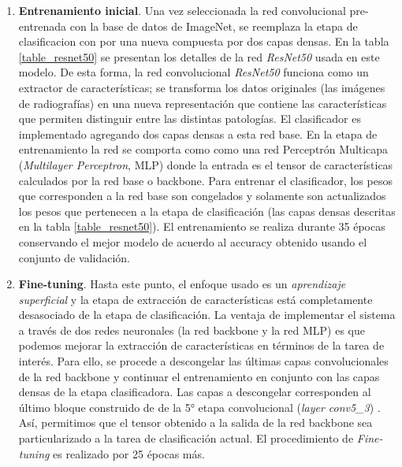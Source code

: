 {%
\begin{enumerate}
    \item \textbf{Entrenamiento inicial}. Una vez seleccionada la red convolucional pre-entrenada
          con la base de datos de ImageNet, se reemplaza la etapa de clasificacion con por una nueva
          compuesta por dos capas densas. En la tabla \ref{table_resnet50} se presentan los detalles
          de la red \textit{ResNet50} usada en este modelo. De esta forma, la red convolucional
          \textit{ResNet50} funciona como un extractor de características; se transforma los datos
          originales (las imágenes de radiografías) en una nueva representación que contiene las
          características que permiten distinguir entre las distintas patologías. El clasificador es
          implementado agregando dos capas densas a esta red base. En la etapa de entrenamiento la
          red se comporta como como una red Perceptrón Multicapa (\textit{Multilayer Perceptron},
          MLP) donde la entrada es el tensor de características calculados por la red base o
          backbone. Para entrenar el clasificador, los pesos que corresponden a la red base son
          congelados y solamente son actualizados los pesos que pertenecen a la etapa de
          clasificación (las capas densas descritas en la tabla \ref{table_resnet50}). El
          entrenamiento se realiza durante 35 épocas conservando el mejor modelo de acuerdo al
          accuracy obtenido usando el conjunto de validación.

    \item \textbf{Fine-tuning}. Hasta este punto, el enfoque usado es un \textit{aprendizaje superficial}
          y la etapa de extracción de características está completamente desasociado de la etapa de
          clasificación. La ventaja de implementar el sistema a través de dos redes neuronales (la
          red backbone y la red MLP) es que podemos mejorar la extracción de características en
          términos de la tarea de interés. Para ello, se procede a descongelar las últimas capas
          convolucionales de la red backbone y continuar el entrenamiento en conjunto con las capas
          densas de la etapa clasificadora. Las capas a descongelar corresponden al último bloque
          construido de de la 5° etapa convolucional (\textit{layer conv5\_3}) \cite{he2016deep}.
          Así, permitimos que el tensor obtenido a la salida de la red backbone sea particularizado
          a la tarea de clasificación actual. El procedimiento de \textit{Fine-tuning} es realizado
          por 25 épocas más.


\end{enumerate}}
